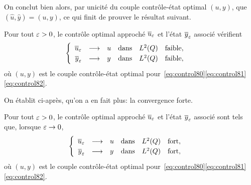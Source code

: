 On conclut bien alors, par unicité du couple contrôle-état optimal $(u,y)$,
que $\left({\hat{u},\hat{y}}\right) = (u,y)$, ce qui finit de prouver le
résultat suivant.

\begin{proposition}%
    Pour tout $\varepsilon > 0$, le contrôle optimal approché ${\overline{u}}_{\varepsilon}$ et
    l'état ${\overline{y}}_{\varepsilon}$ associé vérifient
    \begin{equation*}
        \begin{cases}\displaystyle
            \begin{array}{rcllll}
                {\overline{u}}_{\varepsilon} & \longrightarrow & u & \text{dans} & L^{2}\!\left({Q}\right)
                & \text{faible},\\
                {\overline{y}}_{\varepsilon} & \longrightarrow & y & \text{dans} & L^{2}\!\left({Q}\right)
                & \text{faible},
            \end{array}
        \end{cases}
    \end{equation*}
    où $(u,y)$ est le couple contrôle-état optimal
    pour~\eqref{eq:control80}\eqref{eq:control81}\eqref{eq:control82}.
\end{proposition}

On établit ci-après, qu'on a en fait plus: la convergence forte.

\begin{theoreme}%
    Pour tout $\varepsilon > 0$, le contrôle optimal approché ${\overline{u}}_{\varepsilon}$ et
    l'état ${\overline{y}}_{\varepsilon}$ associé sont tels que, lorsque $\varepsilon \to 0$,
    \begin{equation*}
        \begin{cases}\displaystyle
            \begin{array}{rcllll}
                {\overline{u}}_{\varepsilon} & \longrightarrow & u & \text{dans} &
                L^{2}\!\left({Q}\right) & \text{fort},\\
                {\overline{y}}_{\varepsilon} & \longrightarrow & y & \text{dans} & L^{2}\!\left({Q}\right)
                & \text{fort},
            \end{array}
        \end{cases}
    \end{equation*}
    où $(u,y)$ est le couple contrôle-état optimal
    pour~\eqref{eq:control80}\eqref{eq:control81}\eqref{eq:control82}.
\end{theoreme}

